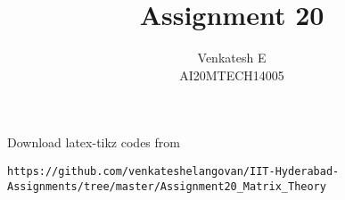 \documentclass[journal,12pt]{IEEEtran}
\begin{document}
\onecolumn

\newtheorem{theorem}{Theorem}[section]
\newtheorem{problem}{Problem}
\newtheorem{proposition}{Proposition}[section]
\newtheorem{lemma}{Lemma}[section]
\newtheorem{corollary}[theorem]{Corollary}
\newtheorem{example}{Example}[section]
\newtheorem{definition}[problem]{Definition}

\newcommand{\BEQA}{\begin{eqnarray}}
\newcommand{\EEQA}{\end{eqnarray}}
\newcommand{\define}{\stackrel{\triangle}{=}}

\raggedbottom
\setlength{\parindent}{0pt}
\providecommand{\mbf}{\mathbf}
\providecommand{\pr}[1]{\ensuremath{\Pr\left(#1\right)}}
\providecommand{\qfunc}[1]{\ensuremath{Q\left(#1\right)}}
\providecommand{\sbrak}[1]{\ensuremath{{}\left[#1\right]}}
\providecommand{\lsbrak}[1]{\ensuremath{{}\left[#1\right.}}
\providecommand{\rsbrak}[1]{\ensuremath{{}\left.#1\right]}}
\providecommand{\brak}[1]{\ensuremath{\left(#1\right)}}
\providecommand{\lbrak}[1]{\ensuremath{\left(#1\right.}}
\providecommand{\rbrak}[1]{\ensuremath{\left.#1\right)}}
\providecommand{\cbrak}[1]{\ensuremath{\left\{#1\right\}}}
\providecommand{\lcbrak}[1]{\ensuremath{\left\{#1\right.}}
\providecommand{\rcbrak}[1]{\ensuremath{\left.#1\right\}}}
\theoremstyle{remark}
\newtheorem{rem}{Remark}
\newcommand{\sgn}{\mathop{\mathrm{sgn}}}
\providecommand{\system}{\overset{\mathcal{H}}{ \longleftrightarrow}}
\newcommand{\solution}{\noindent \textbf{Solution: }}
\newcommand{\cosec}{\,\text{cosec}\,}
\providecommand{\dec}[2]{\ensuremath{\overset{#1}{\underset{#2}{\gtrless}}}}
\newcommand{\myvec}[1]{\ensuremath{\begin{pmatrix}#1\end{pmatrix}}}
\newcommand{\mydet}[1]{\ensuremath{\begin{vmatrix}#1\end{vmatrix}}}
\makeatletter
{}
\makeatother
\let\StandardTheFigure\thefigure
\let\vec\mathbf
\renewcommand{\thefigure}{\theproblem}
\def\putbox#1#2#3{\makebox[0in][l]{\makebox[#1][l]{}\raisebox{\baselineskip}[0in][0in]{\raisebox{#2}[0in][0in]{#3}}}}
     \def\rightbox#1{\makebox[0in][r]{#1}}
     \def\centbox#1{\makebox[0in]{#1}}
     \def\topbox#1{\raisebox{-\baselineskip}[0in][0in]{#1}}
     \def\midbox#1{\raisebox{-0.5\baselineskip}[0in][0in]{#1}}
\vspace{3cm}
\title{Assignment 20}
\author{Venkatesh E\\AI20MTECH14005}
\maketitle
\bigskip
\renewcommand{\thefigure}{\theenumi}
\renewcommand{\thetable}{\theenumi}
Download latex-tikz codes from
\begin{lstlisting}
https://github.com/venkateshelangovan/IIT-Hyderabad-Assignments/tree/master/Assignment20_Matrix_Theory
\end{lstlisting}
\end{document}

